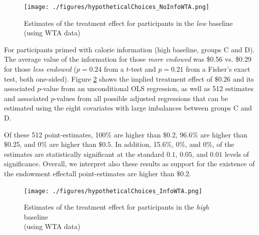 
\begin{figure}[ht]
  \caption{Estimates of the treatment effect for participants in the \emph{low} baseline \\ (using WTA data)}\label{fig:resultsLowBaselineWTA}
  \begin{center}
  {\texttt{[image: ./figures/hypotheticalChoices\_NoInfoWTA.png]}}
  \end{center}
\end{figure}

For participants primed with calorie information (high baseline, groups C and D). The average value of the information for those \emph{more endowed} was \$0.56 vs. \$0.29 for those \emph{less endowed} ($p=0.24$ from a $t$-test and $p=0.21$ from a Fisher's exact test, both one-sided). Figure \ref{fig:resultsHighBaselineWTA} shows the implied treatment effect of $\$0.26$ and its associated $p$-value from an unconditional OLS regression, as well as 512 estimates and associated $p$-values from all possible adjusted regressions that can be estimated using the eight covariates with large imbalances between groups C and D.

Of these 512 point-estimates, 100\% are higher than $\$0.2$, 96.6\% are higher than $\$0.25$, and 0\% are higher than $\$0.5$. In addition, 15.6\%, 0\%, and 0\%, of the estimates are statistically significant at the standard $0.1$, $0.05$, and $0.01$ levels of significance. Overall, we interpret also these results as support for the existence of the endowment effect\textemdash all point-estimates are higher than $\$0.2$.

\begin{figure}[ht]
  \caption{Estimates of the treatment effect for participants in the \emph{high} baseline \\ (using WTA data)}\label{fig:resultsHighBaselineWTA}
  \begin{center}
  {\texttt{[image: ./figures/hypotheticalChoices\_InfoWTA.png]}}
  \end{center}
\end{figure}
